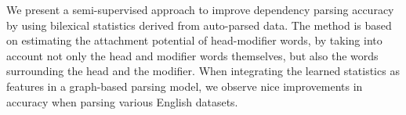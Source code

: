We present a semi-supervised approach to improve dependency parsing accuracy by using bilexical statistics derived from auto-parsed data. The method is based on estimating the attachment potential of head-modifier words, by taking into account not only the head and modifier words themselves, but also the words surrounding the head and the modifier. When integrating the learned statistics as features in a graph-based parsing model, we observe nice improvements in accuracy when parsing various English datasets.
